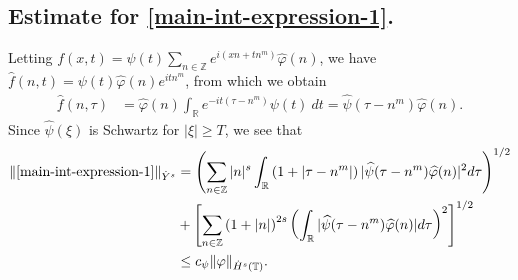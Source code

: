 \documentclass[12pt,reqno]{amsart}
\numberwithin{equation}{section}  %
\numberwithin{figure}{section}
\newcommand{\rr}{\mathbb{R}}
\newcommand{\zz}{\mathbb{Z}}
\newcommand{\ci}{\mathbb{T}}
\newcommand{\wh}{\widehat}
\newcommand{\vp}{\varphi}
\theoremstyle{plain}
\theoremstyle{definition}
\theoremstyle{remark}
\begin{document}
\subsection{Estimate for \eqref{main-int-expression-1}.}
%
%
Letting $f(x,t) = \psi(t) \sum_{n \in \zz} e^{i(xn + tn^{m})} 
\wh{\vp}(n)$, we have $\wh{f}(n,t) = \psi(t) \wh{\vp}(n) e^{itn^{m}}$,
from which we obtain
%
%
\begin{equation}
	\label{fourier-trans-calc}
	\begin{split}
		\wh{f}(n, \tau)
		& = \wh{\vp}(n) \int_\rr e^{-it( \tau - n^{m})} 
		\psi(t) \ d t
		= \wh{\psi}(\tau - n^{m}) \wh{\vp}(n).
	\end{split}
\end{equation}
%
%
%
%
%
%
Since $\wh{\psi}(\xi)$ is Schwartz for $|\xi| \ge T$, we see that 
%
%
\begin{equation}
	\begin{split}
	\label{main-int1-est}
		\|\eqref{main-int-expression-1}\|_{\dot{Y}^s}
		& = \left (  \sum_{n\in \zz} |n|^s \int_\rr \left( 1 + | \tau - n^{m} 
		| \right )
		| \wh{\psi}(\tau - n^{m}) \wh{\vp}(n) |^2 d \tau \right)^{1/2} 
		\\
		& + \left[ \sum_{n \in \zz }\left( 1 + | n | \right)^{2s} \left( \int_{\rr} |
		\wh{\psi}(\tau - n^{m})\wh{\vp}(n) | d \tau
		\right)^{2} \right]^{1/2}
		\\
		& \le c_{\psi}
		\|\vp\|_{\dot{H}^s(\ci)}.
	\end{split}
\end{equation}
%
%
%
%
\end{document}
